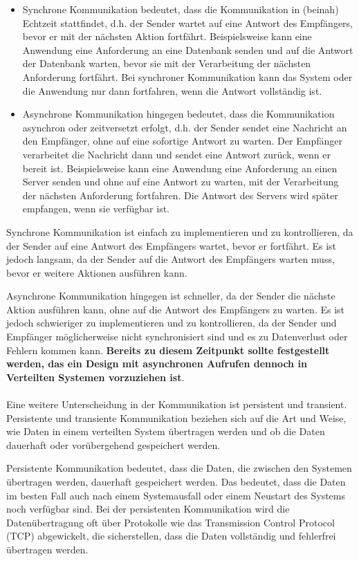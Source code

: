 \begin{itemize} 
\item Synchrone Kommunikation bedeutet, dass die Kommunikation in (beinah) Echtzeit stattfindet, d.h. der Sender wartet auf eine Antwort des Empfängers, bevor er mit der nächsten Aktion fortfährt. Beispielsweise kann eine Anwendung eine Anforderung an eine Datenbank senden und auf die Antwort der Datenbank warten, bevor sie mit der Verarbeitung der nächsten Anforderung fortfährt. Bei synchroner Kommunikation kann das System oder die Anwendung nur dann fortfahren, wenn die Antwort vollständig ist.
\item Asynchrone Kommunikation hingegen bedeutet, dass die Kommunikation asynchron oder zeitversetzt erfolgt, d.h. der Sender sendet eine Nachricht an den Empfänger, ohne auf eine sofortige Antwort zu warten. Der Empfänger verarbeitet die Nachricht dann und sendet eine Antwort zurück, wenn er bereit ist. Beispielsweise kann eine Anwendung eine Anforderung an einen Server senden und ohne auf eine Antwort zu warten, mit der Verarbeitung der nächsten Anforderung fortfahren. Die Antwort des Servers wird später empfangen, wenn sie verfügbar ist.
\end{itemize}  
Synchrone Kommunikation ist einfach zu implementieren und zu kontrollieren, da der Sender auf eine Antwort des Empfängers wartet, bevor er fortfährt. Es ist jedoch langsam, da der Sender auf die Antwort des Empfängers warten muss, bevor er weitere Aktionen ausführen kann.

Asynchrone Kommunikation hingegen ist schneller, da der Sender die nächste Aktion ausführen kann, ohne auf die Antwort des Empfängers zu warten. Es ist jedoch schwieriger zu implementieren und zu kontrollieren, da der Sender und Empfänger möglicherweise nicht synchronisiert sind und es zu Datenverlust oder Fehlern kommen kann. \textbf{Bereits zu diesem Zeitpunkt sollte festgestellt werden, das ein Design mit asynchronen Aufrufen dennoch in Verteilten Systemen vorzuziehen ist}.
\\\\
Eine weitere Unterscheidung in der Kommunikation ist persistent und transient. Persistente und transiente Kommunikation beziehen sich auf die Art und Weise, wie Daten in einem verteilten System übertragen werden und ob die Daten dauerhaft oder vorübergehend gespeichert werden.

Persistente Kommunikation bedeutet, dass die Daten, die zwischen den Systemen übertragen werden, dauerhaft gespeichert werden. Das bedeutet, dass die Daten im besten Fall auch nach einem Systemausfall oder einem Neustart des Systems noch verfügbar sind. Bei der persistenten Kommunikation wird die Datenübertragung oft über Protokolle wie das Transmission Control Protocol (TCP) abgewickelt, die sicherstellen, dass die Daten vollständig und fehlerfrei übertragen werden.

